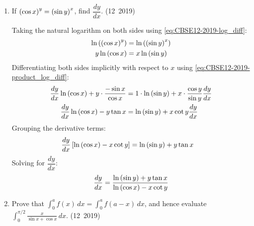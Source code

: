 \begin{enumerate}[label=\thesubsection.\arabic*, ref=\thesubsection.\theenumi]
\item If $\left(\cos x\right)^y = \left(\sin y\right)^x$, find $\dfrac{dy}{dx}$.
\hfill (12~2019)

\solution
Taking the natural logarithm on both sides using \eqref{eq:CBSE12-2019-log_diff}:
\begin{align}
	\ln\left(\left(\cos x\right)^y\right) &= \ln\left(\left(\sin y\right)^x\right) \\
	y \ln\left(\cos x\right) &= x \ln\left(\sin y\right)
\end{align}
Differentiating both sides implicitly with respect to $x$ using \eqref{eq:CBSE12-2019-product_log_diff}:
\begin{align}
	\frac{dy}{dx}\ln\left(\cos x\right) + y\cdot\frac{-\sin x}{\cos x} &= 1\cdot\ln\left(\sin y\right) + x\cdot\frac{\cos y}{\sin y}\frac{dy}{dx} \\
	\frac{dy}{dx}\ln\left(\cos x\right) - y\tan x &= \ln\left(\sin y\right) + x\cot y\frac{dy}{dx}
\end{align}
Grouping the derivative terms:
\begin{align}
	\frac{dy}{dx}{}\left[\ln\left(\cos x\right) - x\cot y\right] &= \ln\left(\sin y\right) + y\tan x
\end{align}
Solving for $\dfrac{dy}{dx}$:
\begin{align}
	\frac{dy}{dx} = \frac{\ln\left(\sin y\right) + y\tan x}{\ln\left(\cos x\right) - x\cot y}
\end{align}



\item Prove that $\displaystyle\int_0^a f(x)\,dx = \int_0^a f(a-x)\,dx$, and hence evaluate $\displaystyle\int_0^{\pi/2}\frac{x}{\sin x+\cos x}\,dx$.
\hfill (12~2019)


\end{enumerate}
